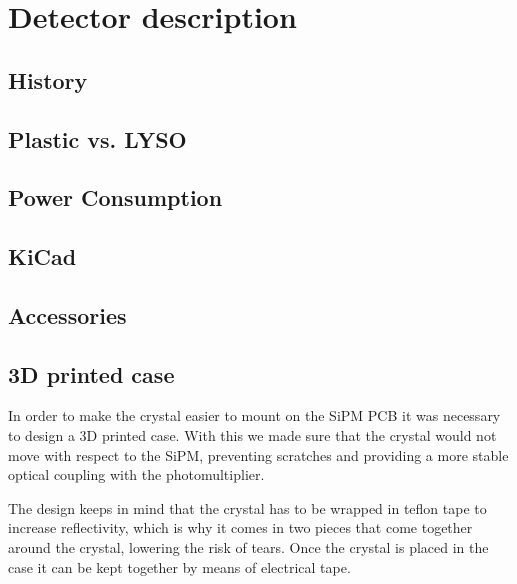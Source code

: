 \chapter{Detector description}

\section{History}

\section{Plastic vs. LYSO}

\section{Power Consumption}

\section{KiCad}

\section{Accessories}

\section{3D printed case}

In order to make the crystal easier to mount on the SiPM PCB it was necessary to design a 3D printed case. With this we made sure that the crystal would not move with respect to the SiPM, preventing scratches and providing a more stable optical coupling with the photomultiplier.

The design keeps in mind that the crystal has to be wrapped in teflon tape to increase reflectivity, which is why it comes in two pieces that come together around the crystal, lowering the risk of tears. Once the crystal is placed in the case it can be kept together by means of electrical tape.